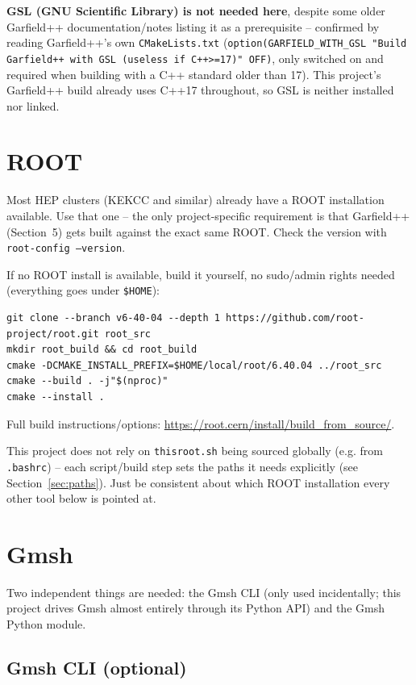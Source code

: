 \documentclass[11pt]{article}
\begin{document}
\textbf{GSL (GNU Scientific Library) is not needed here}, despite some
older Garfield++ documentation/notes listing it as a prerequisite --
confirmed by reading Garfield++'s own \texttt{CMakeLists.txt}
(\texttt{option(GARFIELD\_WITH\_GSL "Build Garfield++ with GSL (useless
if C++>=17)" OFF)}, only switched on and required when building with a
C++ standard older than 17). This project's Garfield++ build already
uses C++17 throughout, so GSL is neither installed nor linked.

\section{ROOT}

Most HEP clusters (KEKCC and similar) already have a ROOT installation
available. Use that one -- the only project-specific requirement is that
Garfield++ (Section~5) gets built against the exact same ROOT. Check the
version with \texttt{root-config --version}.

If no ROOT install is available, build it yourself, no sudo/admin rights
needed (everything goes under \texttt{\$HOME}):

\begin{lstlisting}
git clone --branch v6-40-04 --depth 1 https://github.com/root-project/root.git root_src
mkdir root_build && cd root_build
cmake -DCMAKE_INSTALL_PREFIX=$HOME/local/root/6.40.04 ../root_src
cmake --build . -j"$(nproc)"
cmake --install .
\end{lstlisting}

Full build instructions/options:
\url{https://root.cern/install/build_from_source/}.

This project does not rely on \texttt{thisroot.sh} being sourced
globally (e.g. from \texttt{.bashrc}) -- each script/build step sets the
paths it needs explicitly (see Section~\ref{sec:paths}). Just be
consistent about which ROOT installation every other tool below is
pointed at.

\section{Gmsh}

Two independent things are needed: the Gmsh CLI (only used incidentally;
this project drives Gmsh almost entirely through its Python API) and the
Gmsh Python module.

\subsection{Gmsh CLI (optional)}
\end{document}
